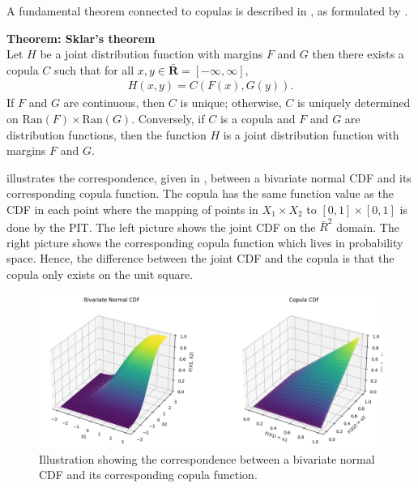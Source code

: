 A fundamental theorem connected to copulas is described in , as formulated by \citet[p.~18]{Nelsen2006}. 
\begin{theorem}\label{the:Sklars}
        \textbf{Theorem: Sklar's theorem} \\
        Let $H$ be a joint distribution function with margins $F$ and $G$ then there exists a copula $C$ such that for all $x,y \in \bar{\mathbf{R}} = \left[-\infty, \infty \right]$, 
        \begin{align}
            H(x,y) = C(F(x), G(y)). \label{eq:Sklar}
        \end{align}
        If $F$ and $G$ are continuous, then $C$ is unique; otherwise, $C$ is uniquely determined on $\mathrm{Ran}(F)\times\mathrm{Ran}(G)$. Conversely, if $C$ is a copula and $F$ and $G$ are distribution functions, then the function $H$ is a joint distribution function with margins $F$ and $G$.
\end{theorem}

 illustrates the correspondence, given in , between a bivariate normal \gls{CDF} and its corresponding copula function. The copula has the same function value as the \gls{CDF} in each point where the mapping of points in $X_1\times X_2$ to $[0,1]\times[0,1]$ is done by the \gls{PIT}. The left picture shows the joint \gls{CDF} on the $\bar{R}^2$ domain. The right picture shows the corresponding copula function which lives in probability space. Hence, the difference between the joint \gls{CDF} and the copula is that the copula only exists on the unit square. 

\begin{figure}
    \centering
    \includegraphics[width=1\linewidth]{3Theory/pictures/Copula.png}
    \caption{Illustration showing the correspondence between a bivariate normal \gls{CDF} and its corresponding copula function.}
    \label{fig:CDFtoCopula}
\end{figure}

